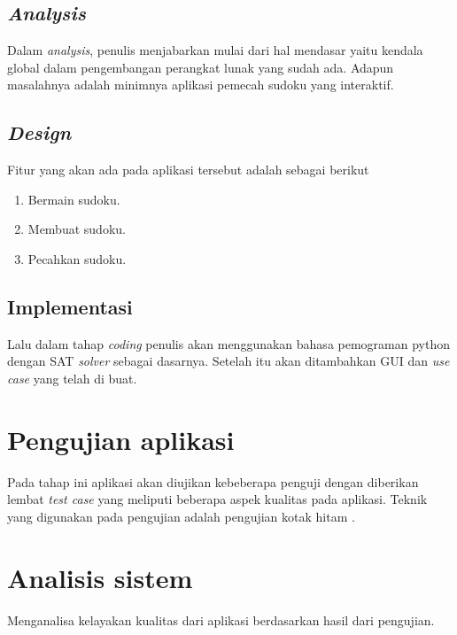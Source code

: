 \subsection{\textit{Analysis}}

Dalam \textit{analysis}, penulis menjabarkan mulai dari hal
mendasar yaitu kendala global dalam pengembangan perangkat lunak yang sudah ada. Adapun masalahnya adalah minimnya aplikasi pemecah sudoku yang interaktif.

\subsection{\textit{Design}}

Fitur yang akan ada pada aplikasi tersebut adalah sebagai berikut

 \begin{enumerate}
 	\item Bermain sudoku.
 	\item Membuat sudoku.
 	\item Pecahkan sudoku.
 \end{enumerate}

\subsection{Implementasi}

Lalu dalam tahap \textit{coding} penulis akan menggunakan
bahasa pemograman python dengan SAT \textit{solver} \cite{SATPy2} sebagai dasarnya. Setelah itu akan ditambahkan GUI dan \textit{use case} yang telah di buat.

\section{Pengujian aplikasi}

Pada tahap ini aplikasi akan diujikan kebeberapa penguji dengan diberikan lembat \textit{test case} yang meliputi beberapa aspek kualitas pada aplikasi. Teknik yang digunakan pada pengujian adalah pengujian kotak hitam \cite{TEST1}.

\section{Analisis sistem}

Menganalisa kelayakan kualitas dari aplikasi berdasarkan hasil dari pengujian.